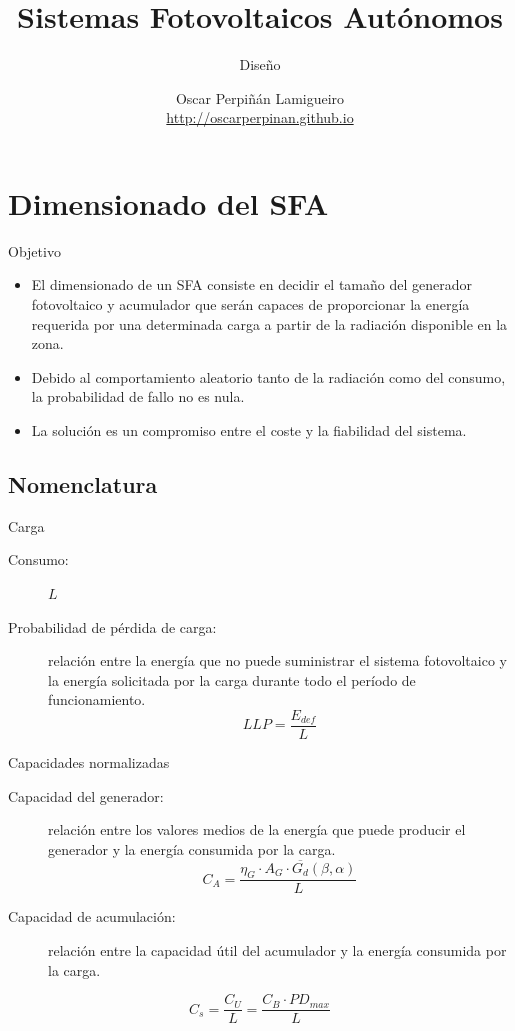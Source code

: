 \documentclass[xcolor={usenames,svgnames,dvipsnames}]{beamer}
\author{Oscar Perpiñán Lamigueiro \\ \url{http://oscarperpinan.github.io}}
\date{}
\title{Sistemas Fotovoltaicos Autónomos}
\subtitle{Diseño}
\begin{document}
\maketitle

\section{Dimensionado del SFA}
\label{sec:orgfec6fe2}
\begin{frame}[label={sec:org71b7e0d}]{Objetivo}
\begin{itemize}
\item El dimensionado de un SFA consiste en \alert{decidir el tamaño del
generador fotovoltaico y acumulador} que serán capaces de
\alert{proporcionar la energía requerida} por una determinada carga a partir
de la \alert{radiación disponible} en la zona.

\item Debido al comportamiento aleatorio tanto de la radiación como del
consumo, la \alert{probabilidad de fallo no es nula}.

\item La solución es un compromiso entre el coste y la fiabilidad del
sistema.
\end{itemize}
\end{frame}


\subsection{Nomenclatura}
\label{sec:orgf3d6205}
\begin{frame}[label={sec:orgc126118}]{Carga}
\begin{description}
\item[{Consumo:}] \(L\)

\item[{Probabilidad de pérdida de carga:}] relación entre la energía que no
puede suministrar el sistema fotovoltaico y la energía solicitada por
la carga durante todo el período de
funcionamiento.$$LLP=\frac{E_{def}}{L}$$
\end{description}
\end{frame}

\begin{frame}[label={sec:orga924e4a}]{Capacidades normalizadas}
\begin{description}
\item[{Capacidad del generador:}] relación entre los valores medios de la
energía que puede producir el generador y la energía consumida por la
carga.
$$C_{A}=\frac{\eta_{G}\cdot A_{G}\cdot\overline{G_{d}}(\beta,\alpha)}{L}$$

\item[{Capacidad de acumulación:}] relación entre la capacidad útil del acumulador y la energía consumida por la carga.
\end{description}
$$C_{s}=\frac{C_{U}}{L}=\frac{C_{B}\cdot PD_{max}}{L}$$
\end{frame}
\end{document}
